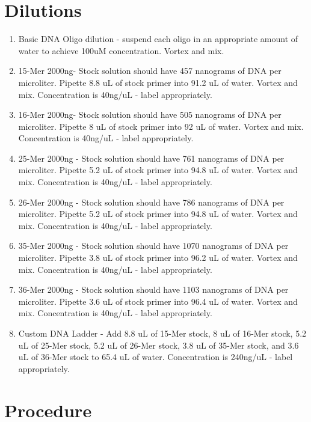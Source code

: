\documentclass[letterpaper]{article}
\begin{document}
\section{Dilutions}
\begin{enumerate}
\item{Basic DNA Oligo dilution - suspend each oligo in an appropriate amount of water to achieve 100uM concentration. Vortex and mix.}
\item{15-Mer 2000ng- Stock solution should have 457 nanograms of DNA per microliter. Pipette 8.8 uL of stock primer into 91.2 uL of water. Vortex and mix. Concentration is 40ng/uL - label appropriately.}
\item{16-Mer 2000ng- Stock solution should have 505 nanograms of DNA per microliter. Pipette 8 uL of stock primer into 92 uL of water. Vortex and mix. Concentration is 40ng/uL - label appropriately.}
\item{25-Mer 2000ng - Stock solution should have 761 nanograms of DNA per microliter. Pipette 5.2 uL of stock primer into 94.8 uL of water. Vortex and mix. Concentration is 40ng/uL - label appropriately.}
\item{26-Mer 2000ng - Stock solution should have 786 nanograms of DNA per microliter. Pipette 5.2 uL of stock primer into 94.8 uL of water. Vortex and mix. Concentration is 40ng/uL - label appropriately.}
\item{35-Mer 2000ng - Stock solution should have 1070 nanograms of DNA per microliter. Pipette 3.8 uL of stock primer into 96.2 uL of water. Vortex and mix. Concentration is 40ng/uL - label appropriately.}
\item{36-Mer 2000ng - Stock solution should have 1103 nanograms of DNA per microliter. Pipette 3.6 uL of stock primer into 96.4 uL of water. Vortex and mix. Concentration is 40ng/uL - label appropriately.}
\item{Custom DNA Ladder - Add 8.8 uL of 15-Mer stock, 8 uL of 16-Mer stock, 5.2 uL of 25-Mer stock, 5.2 uL of 26-Mer stock, 3.8 uL of 35-Mer stock, and 3.6 uL of 36-Mer stock to 65.4 uL of water. Concentration is 240ng/uL - label appropriately. }
\end{enumerate}

\section{Procedure}%
\end{document}
